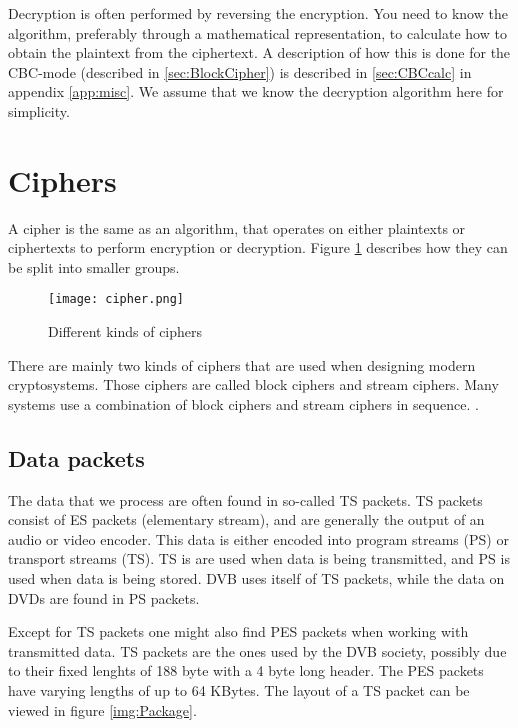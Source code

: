 Decryption is often performed by reversing the encryption. You need to know the 
algorithm, preferably through a mathematical representation, to calculate how 
to obtain the plaintext from the ciphertext. A description of how this is done 
for the CBC-mode (described in \ref{sec:BlockCipher}) is described in 
\ref{sec:CBCcalc} in appendix \ref{app:misc}. We assume that we know the 
decryption algorithm here for simplicity. 

\section{Ciphers}
A cipher is the same as an algorithm, that operates on either plaintexts or 
ciphertexts to perform encryption or decryption. Figure \ref{img:ciphers} 
describes how they can be split into smaller groups.

 \begin{figure}
   \texttt{[image: cipher.png]}
   \caption{Different kinds of ciphers \citep{CipherTax:2013}}
   \label{img:ciphers}
 \end{figure}

There are mainly two kinds of ciphers that are used when designing modern 
cryptosystems. Those ciphers are called block ciphers and stream ciphers. 
Many systems use a combination of block ciphers and stream ciphers in sequence.
.

\subsection{Data packets}\label{sec:Data}
The data that we process are often found in so-called TS packets. TS packets 
consist of ES packets (elementary stream), and are generally the output of an 
audio or video encoder. This data is either encoded into program streams (PS) or 
transport streams (TS). TS is are used when data is being transmitted, and PS is 
used when data is being stored. DVB uses itself of TS packets, while the data on 
DVDs are found in PS packets.

Except for TS packets one might also find PES packets when working with 
transmitted data. 
TS packets are the ones used by the DVB society, possibly due to their fixed 
lenghts of 188 byte with a 4 byte long header. The PES packets have varying 
lengths of up to 64 KBytes. The layout of a TS packet can be viewed in figure 
\ref{img:Package}.

